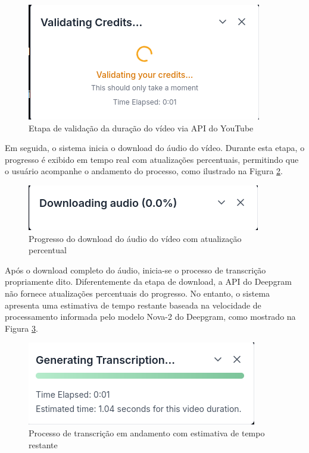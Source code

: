 \documentclass[tcc,capa]{texufpel}
\begin{document}
\begin{figure}[H]
  \centering
  \includegraphics[width=\textwidth,height=0.45\textheight,keepaspectratio]{exemplo-slides/graphics/images/validating.png}
  \caption{Etapa de validação da duração do vídeo via API do YouTube}
  \label{fig:validating}
\end{figure}

Em seguida, o sistema inicia o download do áudio do vídeo. Durante esta etapa, o progresso é exibido em tempo real com atualizações percentuais, permitindo que o usuário acompanhe o andamento do processo, como ilustrado na Figura \ref{fig:downloading}.

\begin{figure}[H]
  \centering
  \includegraphics[width=\textwidth,height=0.45\textheight,keepaspectratio]{exemplo-slides/graphics/images/downloading.png}
  \caption{Progresso do download do áudio do vídeo com atualização percentual}
  \label{fig:downloading}
\end{figure}

Após o download completo do áudio, inicia-se o processo de transcrição propriamente dito. Diferentemente da etapa de download, a API do Deepgram não fornece atualizações percentuais do progresso. No entanto, o sistema apresenta uma estimativa de tempo restante baseada na velocidade de processamento informada pelo modelo Nova-2 do Deepgram, como mostrado na Figura \ref{fig:transcribing}.

\begin{figure}[H]
  \centering
  \includegraphics[width=\textwidth,height=0.45\textheight,keepaspectratio]{exemplo-slides/graphics/images/transcribing.png}
  \caption{Processo de transcrição em andamento com estimativa de tempo restante}
  \label{fig:transcribing}
\end{figure}
\end{document}
